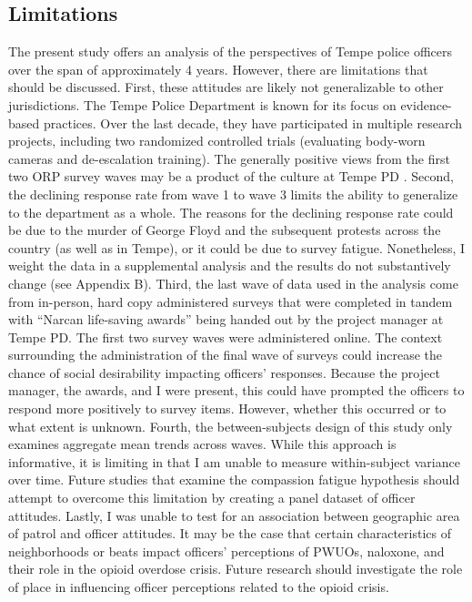 \subsection{Limitations}
The present study offers an analysis of the perspectives of Tempe police officers over the span of approximately 4 years. However, there are limitations that should be discussed. First, these attitudes are likely not generalizable to other jurisdictions. The Tempe Police Department is known for its focus on evidence-based practices. Over the last decade, they have participated in multiple research projects, including two randomized controlled trials (evaluating body-worn cameras and de-escalation training). The generally positive views from the first two ORP survey waves may be a product of the culture at Tempe PD \parencite{white_narcan_2021}. 
Second, the declining response rate from wave 1 to wave 3 limits the ability to generalize to the department as a whole. The reasons for the declining response rate could be due to the murder of George Floyd and the subsequent protests across the country (as well as in Tempe), or it could be due to survey fatigue. Nonetheless, I weight the data in a supplemental analysis and the results do not substantively change (see Appendix B). Third, the last wave of data used in the analysis come from in-person, hard copy administered surveys that were completed in tandem with “Narcan life-saving awards” being handed out by the project manager at Tempe PD. The first two survey waves were administered online. The context surrounding the administration of the final wave of surveys could increase the chance of social desirability impacting officers’ responses. Because the project manager, the awards, and I were present, this could have prompted the officers to respond more positively to survey items. However, whether this occurred or to what extent is unknown. Fourth, the between-subjects design of this study only examines aggregate mean trends across waves. While this approach is informative, it is limiting in that I am unable to measure within-subject variance over time. Future studies that examine the compassion fatigue hypothesis should attempt to overcome this limitation by creating a panel dataset of officer attitudes. Lastly, I was unable to test for an association between geographic area of patrol and officer attitudes.  It may be the case that certain characteristics of neighborhoods or beats impact officers' perceptions of PWUOs, naloxone, and their role in the opioid overdose crisis. Future research should investigate the role of place in influencing officer perceptions related to the opioid crisis. 

